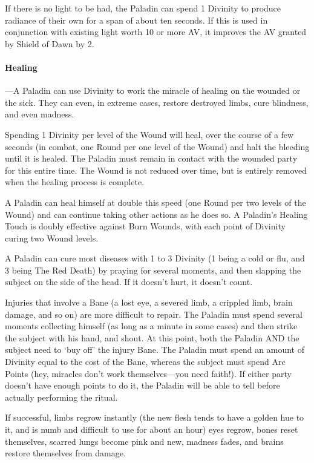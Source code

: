 \documentclass[oneside,11pt,english]{book}
\begin{document}
If there is no light to be had, the Paladin can spend 1 Divinity to produce radiance of their own 
for a span of about ten seconds. If this is used in conjunction with existing light worth 10 or more 
AV, it improves the AV granted by Shield of Dawn by 2. 
\paragraph{Healing}
---\quad A Paladin can use Divinity to work the miracle of healing on the wounded or the sick. They can 
even, in extreme cases, restore destroyed limbs, cure blindness, and even madness.

Spending 1 Divinity per level of the Wound will heal, over the course of a few seconds (in 
combat, one Round per one level of the Wound) and halt the bleeding until it is healed. The 
Paladin must remain in contact with the wounded party for this entire time. The Wound is not 
reduced over time, but is entirely removed when the healing process is complete. 

A Paladin can heal himself at double this speed (one Round per two levels of the Wound) and can 
continue taking other actions as he does so. A Paladin's Healing Touch is doubly effective against 
Burn Wounds, with each point of Divinity curing two Wound levels. 

A Paladin can cure most diseases with 1 to 3 Divinity (1 being a cold or flu, and 3 being The Red 
Death) by praying for several moments, and then slapping the subject on the side of the head. If it 
doesn't hurt, it doesn't count. 

Injuries that involve a Bane (a lost eye, a severed limb, a crippled limb, brain damage, and so on) 
are more difficult to repair. The Paladin must spend several moments collecting himself (as long 
as a minute in some cases) and then strike the subject with his hand, and shout. At this point, both 
the Paladin AND the subject need to ‘buy off’ the injury Bane. The Paladin must spend an 
amount of Divinity equal to the cost of the Bane, whereas the subject must spend Arc Points (hey, 
miracles don't work themselves—you need faith!). If either party doesn't have enough points to 
do it, the Paladin will be able to tell before actually performing the ritual. 


If successful, limbs regrow instantly (the new flesh tends to have a golden hue to it, and is numb 
and difficult to use for about an hour) eyes regrow, bones reset themselves, scarred lungs become 
pink and new, madness fades, and brains restore themselves from damage.
\end{document}
